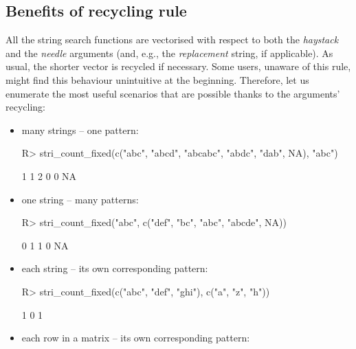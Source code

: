 \documentclass[nojss]{jss}\usepackage[]{graphicx}\usepackage[]{color}
\begin{document}
\subsection{Benefits of recycling rule}

All the string search functions are vectorised
with respect to both the  \textit{haystack} and the \textit{needle} arguments
(and, e.g., the \textit{replacement} string, if applicable).
As usual, the shorter vector is recycled if necessary.
Some users, unaware of this rule, might find this behaviour
unintuitive at the beginning. Therefore, let us enumerate
the most useful scenarios that are possible thanks to the arguments' recycling:

\begin{itemize}
\item many strings -- one pattern:

\begin{Schunk}
\begin{Sinput}
R> stri_count_fixed(c("abc", "abcd", "abcabc", "abdc", "dab", NA), "abc")
\end{Sinput}
\begin{Soutput}
[1]  1  1  2  0  0 NA
\end{Soutput}
\end{Schunk}

\item one string -- many patterns:

\begin{Schunk}
\begin{Sinput}
R> stri_count_fixed("abc", c("def", "bc", "abc", "abcde", NA))
\end{Sinput}
\begin{Soutput}
[1]  0  1  1  0 NA
\end{Soutput}
\end{Schunk}

\item each string -- its own corresponding pattern:

\begin{Schunk}
\begin{Sinput}
R> stri_count_fixed(c("abc", "def", "ghi"), c("a", "z", "h"))
\end{Sinput}
\begin{Soutput}
[1] 1 0 1
\end{Soutput}
\end{Schunk}

\item each row in a matrix -- its own corresponding pattern:


\end{itemize}
\end{document}
